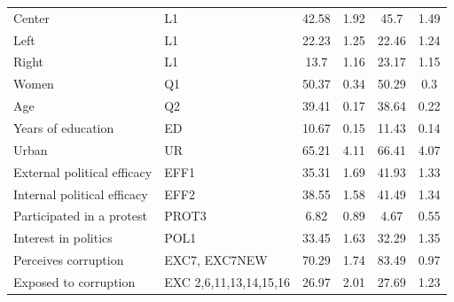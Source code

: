 \documentclass[floatsintext,man]{apa7}\usepackage[]{graphicx}\usepackage[]{color}
\begin{document}
\begin{table}[H]
\begin{tabular}{llcccc}
Center                                        & L1                                                                                      & 42.58    & 1.92           & 45.7     & 1.49           \\
Left                                          & L1                                                                                      & 22.23    & 1.25           & 22.46    & 1.24           \\
Right                                         & L1                                                                                      & 13.7     & 1.16           & 23.17    & 1.15           \\
Women                                         & Q1                                                                                      & 50.37    & 0.34           & 50.29    & 0.3            \\
Age                                           & Q2                                                                                      & 39.41    & 0.17           & 38.64    & 0.22           \\
Years of education                            & ED                                                                                      & 10.67    & 0.15           & 11.43    & 0.14           \\
Urban                                         & UR                                                                                      & 65.21    & 4.11           & 66.41    & 4.07           \\
External political efficacy                   & EFF1                                                                                    & 35.31    & 1.69           & 41.93    & 1.33           \\
Internal political efficacy                   & EFF2                                                                                    & 38.55    & 1.58           & 41.49    & 1.34           \\
Participated in a protest                     & PROT3                                                                                   & 6.82     & 0.89           & 4.67     & 0.55           \\
Interest in politics & POL1 & 33.45 & 1.63 & 32.29 & 1.35 \\
Perceives corruption                          & EXC7, EXC7NEW                                                                           & 70.29    & 1.74           & 83.49    & 0.97           \\
Exposed to corruption                         & EXC 2,6,11,13,14,15,16                                                                  & 26.97    & 2.01           & 27.69    & 1.23           \\ 
\bottomrule
\end{tabular}
\linebreak[4]
\end{table}
\end{document}
